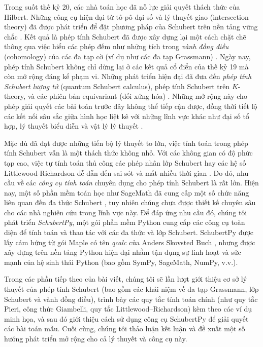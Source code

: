 Trong suốt thế kỷ 20, các nhà toán học đã nỗ lực giải quyết thách thức của Hilbert. Những công cụ hiện đại từ tô-pô đại số và lý thuyết giao (intersection theory) đã được phát triển để đặt phương pháp của Schubert trên nền tảng vững chắc \cite{Kontsevich_1994}. Kết quả là phép tính Schubert đã được xây dựng lại một cách chặt chẽ thông qua việc hiểu các phép đếm như những tích trong \textit{vành đồng điều} (cohomology) của các đa tạp cờ (ví dụ như các đa tạp Grassmann) \cite{BERTRAM1999728}. Ngày nay, phép tính Schubert không chỉ dừng lại ở các kết quả cổ điển của thế kỷ 19 mà còn mở rộng đáng kể phạm vi. Những phát triển hiện đại đã đưa đến \textit{phép tính Schubert lượng tử} (quantum Schubert calculus), phép tính Schubert trên $K$-theory, và các phiên bản equivariant (đối xứng hóa) \cite{ALCO_2018__1_3_327_0}. Những mở rộng này cho phép giải quyết các bài toán trước đây không thể tiếp cận được, đồng thời tiết lộ các kết nối sâu sắc giữa hình học liệt kê với những lĩnh vực khác như đại số tổ hợp, lý thuyết biểu diễn và vật lý lý thuyết \cite{Encyclo_schubert_calculus}.

Mặc dù đã đạt được những tiến bộ lý thuyết to lớn, việc tính toán trong phép tính Schubert vẫn là một thách thức không nhỏ. Với các không gian có độ phức tạp cao, việc tự tính toán thủ công các phép nhân lớp Schubert hay các hệ số Littlewood-Richardson dễ dẫn đến sai sót và mất nhiều thời gian \cite{graysonschubert2}. Do đó, nhu cầu về các \textit{công cụ tính toán} chuyên dụng cho phép tính Schubert là rất lớn. Hiện nay, một số phần mềm toán học như SageMath đã cung cấp một số chức năng liên quan đến đa thức Schubert \cite{sagemath}, tuy nhiên chúng chưa được thiết kế chuyên sâu cho các nhà nghiên cứu trong lĩnh vực này. Để đáp ứng nhu cầu đó, chúng tôi phát triển \textit{SchubertPy}, một gói phần mềm Python cung cấp các công cụ toàn diện để tính toán và thao tác với các đa thức và lớp Schubert. SchubertPy được lấy cảm hứng từ gói Maple có tên \textit{qcalc} của Anders Skovsted Buch \cite{buch2008qcalc}, nhưng được xây dựng trên nền tảng Python hiện đại nhằm tận dụng sự linh hoạt và sức mạnh của hệ sinh thái Python (bao gồm SymPy, SageMath, NumPy, v.v.).

Trong các phần tiếp theo của bài viết, chúng tôi sẽ lần lượt giới thiệu cơ sở lý thuyết của phép tính Schubert (bao gồm các khái niệm về đa tạp Grassmann, lớp Schubert và vành đồng điều), trình bày các quy tắc tính toán chính (như quy tắc Pieri, công thức Giambelli, quy tắc Littlewood–Richardson) kèm theo các ví dụ minh họa, và sau đó giới thiệu cách sử dụng công cụ SchubertPy để giải quyết các bài toán mẫu. Cuối cùng, chúng tôi thảo luận kết luận và đề xuất một số hướng phát triển mở rộng cho cả lý thuyết và công cụ này.